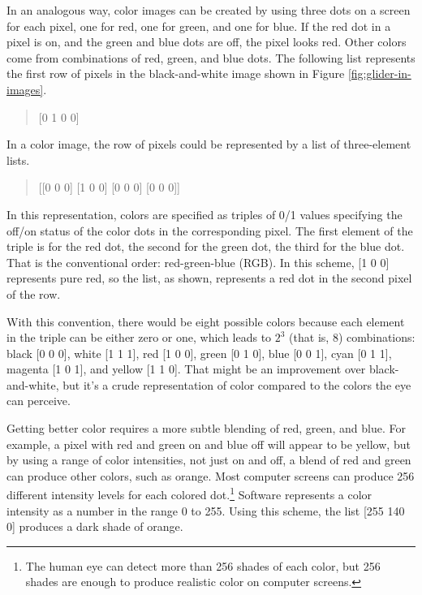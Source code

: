 In an analogous way, color images can be created by using three dots on a screen
for each pixel,
one for red, one for green, and one for blue.
If the red dot in a pixel is on, and the green and blue dots
are off, the pixel looks red. Other colors come from combinations
of red, green, and blue dots.
The following list represents the first row of pixels
in the black-and-white image shown in
Figure \ref{fig:glider-in-images}.
\begin{quote}
    \textsf{[0 1 0 0]}
\end{quote}
In a color image, the row of pixels could be represented by
a list of three-element lists.
\begin{quote}
    \textsf{[[0 0 0] [1 0 0] [0 0 0] [0 0 0]]}
\end{quote}
In this representation, colors are specified as triples of 0/1 values
specifying the off/on status of the color dots in the corresponding pixel.
The first element of the triple is for the red dot, the second
for the green dot, the third for the blue dot.
That is the conventional order:
red-green-blue (RGB).
In this scheme, \textsf{[1 0 0]} represents pure red,
so the list, as shown, represents a red dot in the second pixel of the row.

With this convention, there would be eight possible colors because
each element in the triple can be either zero or one,
which leads to $2^3$ (that is, $8$) combinations:
black \textsf{[0 0 0]},
white \textsf{[1 1 1]},
red \textsf{[1 0 0]},
green \textsf{[0 1 0]},
blue \textsf{[0 0 1]},
cyan \textsf{[0 1 1]},
magenta \textsf{[1 0 1]},
and
yellow \textsf{[1 1 0]}.
That might be an improvement over black-and-white,
but it's a crude representation of color
compared to the colors the eye can perceive.

Getting better color requires a more subtle blending of
red, green, and blue. For example, a pixel with red and green
on and blue off will appear to be yellow,
but by using a range of color intensities,
not just on and off, a blend of red and green can produce other
colors, such as orange. Most computer screens
can produce 256 different intensity levels for each colored dot.\footnote{The
human eye can detect more than 256 shades of
each color, but 256 shades are enough to produce realistic color
on computer screens.}
Software represents a color intensity as a number
in the range 0 to 255.
Using this scheme, the list \textsf{[255 140 0]} produces
a dark shade of orange.


